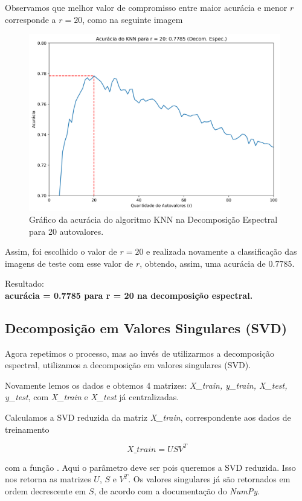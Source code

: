 \documentclass[a4paper, 12pt]{article}
\theoremstyle{definition}
\theoremstyle{remark}
\begin{document}
Observamos que melhor valor de compromisso entre maior acurácia e menor $r$ corresponde a $r = 20$, como na seguinte imagem

\begin{figure}[H]
  \centering
  \includegraphics[width=11cm]{acuracia_espectral_20}
  \caption{Gráfico da acurácia do algoritmo KNN na Decomposição Espectral para 20 autovalores.}
\end{figure}

Assim, foi escolhido o valor de $r = 20$ e realizada novamente a classificação das imagens de teste com esse valor de $r$, obtendo, assim, uma acurácia de $0.7785$.

Resultado:\\
\textbf{
acurácia = 0.7785 para r = 20 na decomposição espectral.}

\subsection{Decomposição em Valores Singulares (SVD)}

Agora repetimos o processo, mas ao invés de utilizarmos a decomposição espectral, utilizamos a decomposição em valores singulares (SVD).

Novamente lemos os dados e obtemos 4 matrizes: \textit{X\_train, y\_train, X\_test, y\_test}, com \textit{X\_train} e \textit{X\_test} já centralizadas.

Calculamos a SVD reduzida da matriz \textit{X\_train}, correspondente aos dados de treinamento

$$X\_train = USV^T$$

com a função . Aqui o parâmetro  deve ser  pois queremos a SVD reduzida. Isso nos retorna as matrizes $U$, $S$ e $V^T$. Os valores singulares já são retornados em ordem decrescente em $S$, de acordo com a documentação do \textit{NumPy}.
\end{document}
